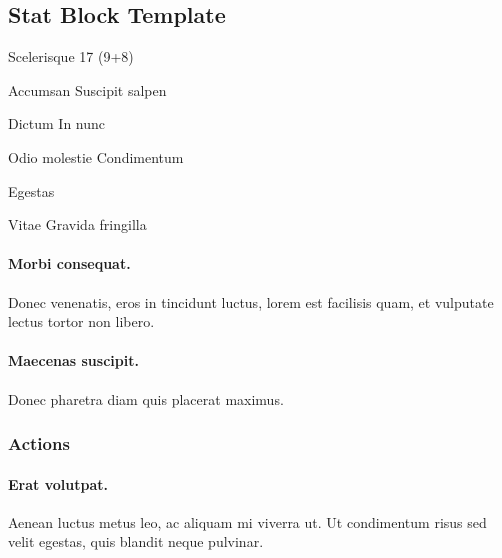 \begin{phStatBlock}
\subsection*{Stat Block Template}
\phSBSep
\begin{phStatBlockDescription}
\item[Scelerisque] 17 (9+8)
\item[Accumsan] Suscipit salpen
\item[Dictum] In nunc
\end{phStatBlockDescription}
\phSBSep
{}
\phSBSep
\begin{phStatBlockDescription}
\item[Odio molestie] Condimentum
\item[Egestas] \phNone
\item[Vitae] Gravida fringilla
\end{phStatBlockDescription}
\phSBSep

\paragraph*{Morbi consequat.} Donec venenatis, eros in tincidunt luctus, lorem est facilisis quam, et vulputate lectus tortor non libero.

\paragraph*{Maecenas suscipit.} Donec pharetra diam quis placerat maximus.

\subsubsection*{Actions}

\paragraph*{Erat volutpat.} Aenean luctus metus leo, ac aliquam mi viverra ut. Ut condimentum risus sed velit egestas, quis blandit neque pulvinar.

\end{phStatBlock}




\phAppendix

 \lipsum[126]

\backmatter

 \lipsum[127]


